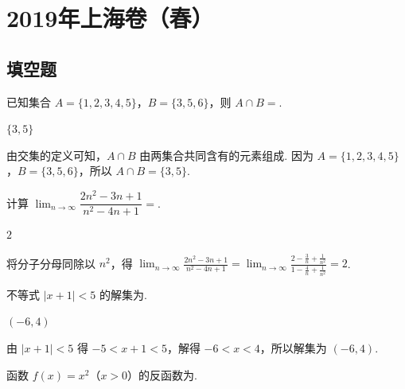 
\chapter{2019年上海卷（春）}

\section{填空题}

\begin{problem}
已知集合 \(A=\{1,2,3,4,5\}\)，\(B=\{3,5,6\}\)，则 \(A\cap B=\)\fillinblank{}.
\end{problem}

\begin{answer}
\(\{3,5\}\)
\end{answer}

\begin{solution}
由交集的定义可知，\(A\cap B\) 由两集合共同含有的元素组成. 因为 \(A=\{1,2,3,4,5\}\)，\(B=\{3,5,6\}\)，所以 \(A\cap B=\{3,5\}\).
\end{solution}

\begin{problem}
计算 \(\displaystyle\lim_{n\to\infty}\dfrac{2n^2-3n+1}{n^2-4n+1}=\)\fillinblank{}.
\end{problem}

\begin{answer}
\(2\)
\end{answer}

\begin{solution}
将分子分母同除以 \(n^2\)，得
\(\displaystyle\lim_{n\to\infty}\frac{2n^2-3n+1}{n^2-4n+1}=\displaystyle\lim_{n\to\infty}\frac{2-\frac3n+\frac1{n^2}}{1-\frac4n+\frac1{n^2}}=2\).
\end{solution}

\begin{problem}
不等式 \(|x+1|<5\) 的解集为\fillinblank{}.
\end{problem}

\begin{answer}
\((-6,4)\)
\end{answer}

\begin{solution}
由 \(|x+1|<5\) 得 \(-5<x+1<5\)，解得 \(-6<x<4\)，所以解集为 \((-6,4)\).
\end{solution}

\begin{problem}
函数 \(f(x)=x^2\)（\(x>0\)）的反函数为\fillinblank{}.
\end{problem}

